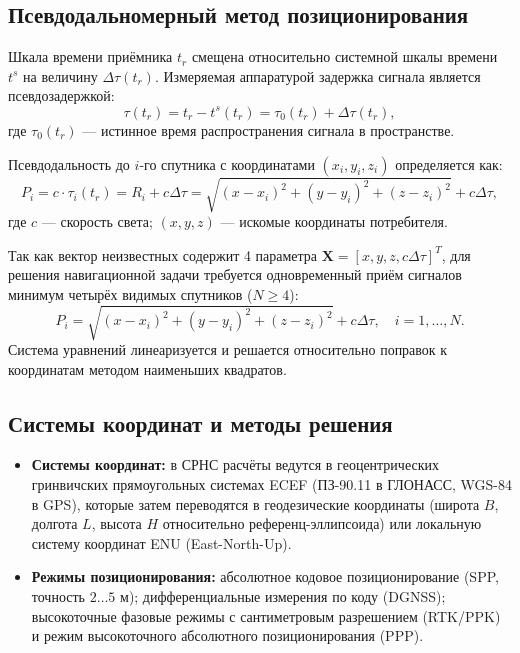 \subsection{Псевдодальномерный метод позиционирования}
Шкала времени приёмника $t_r$ смещена относительно системной шкалы времени $t^s$ на величину $\Delta\tau(t_r)$. Измеряемая аппаратурой задержка сигнала является псевдозадержкой:
\begin{equation}
\tau(t_r) = t_r - t^s(t_r) = \tau_0(t_r) + \Delta\tau(t_r),
\end{equation}
где $\tau_0(t_r)$ --- истинное время распространения сигнала в пространстве. 

Псевдодальность до $i$-го спутника с координатами $(x_i, y_i, z_i)$ определяется как:
\begin{equation}
P_i = c \cdot \tau_i(t_r) = R_i + c\Delta\tau = \sqrt{(x - x_i)^2 + (y - y_i)^2 + (z - z_i)^2} + c\Delta\tau,
\end{equation}
где $c$ --- скорость света; $(x, y, z)$ --- искомые координаты потребителя.

Так как вектор неизвестных содержит 4 параметра $\mathbf{X} = [x, y, z, c\Delta\tau]^T$, для решения навигационной задачи требуется одновременный приём сигналов минимум четырёх видимых спутников ($N \ge 4$):
\begin{equation}
P_i = \sqrt{(x - x_i)^2 + (y - y_i)^2 + (z - z_i)^2} + c\Delta\tau, \quad i = 1, \dots, N.
\end{equation}
Система уравнений линеаризуется и решается относительно поправок к координатам методом наименьших квадратов.

\subsection{Системы координат и методы решения}
\begin{itemize}
    \item \textbf{Системы координат:} в СРНС расчёты ведутся в геоцентрических гринвичских прямоугольных системах ECEF (ПЗ-90.11 в ГЛОНАСС, WGS-84 в GPS), которые затем переводятся в геодезические координаты (широта $B$, долгота $L$, высота $H$ относительно референц-эллипсоида) или локальную систему координат ENU (East-North-Up).
    \item \textbf{Режимы позиционирования:} абсолютное кодовое позиционирование (SPP, точность $2\dots5\text{ м}$); дифференциальные измерения по коду (DGNSS); высокоточные фазовые режимы с сантиметровым разрешением (RTK/PPK) и режим высокоточного абсолютного позиционирования (PPP).
\end{itemize}
